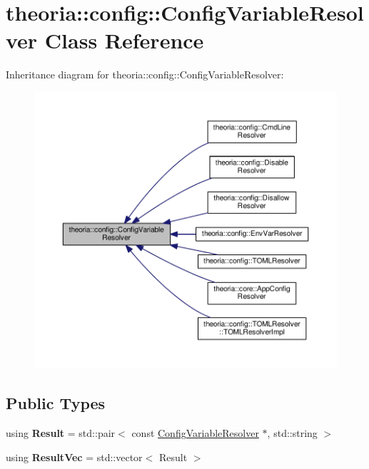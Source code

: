 \hypertarget{classtheoria_1_1config_1_1ConfigVariableResolver}{\section{theoria\+:\+:config\+:\+:Config\+Variable\+Resolver Class Reference}
\label{classtheoria_1_1config_1_1ConfigVariableResolver}
}


Inheritance diagram for theoria\+:\+:config\+:\+:Config\+Variable\+Resolver\+:
\nopagebreak
\begin{figure}[H]
\begin{center}
\leavevmode
\includegraphics[width=350pt]{classtheoria_1_1config_1_1ConfigVariableResolver__inherit__graph}
\end{center}
\end{figure}
\subsection*{Public Types}
\begin{DoxyCompactItemize}
\item 
\hypertarget{classtheoria_1_1config_1_1ConfigVariableResolver_af27a85262d802c9ad4ecb1179efaf447}{using {\bfseries Result} = std\+::pair$<$ const \hyperlink{classtheoria_1_1config_1_1ConfigVariableResolver}{Config\+Variable\+Resolver} $\ast$, std\+::string $>$}\label{classtheoria_1_1config_1_1ConfigVariableResolver_af27a85262d802c9ad4ecb1179efaf447}

\item 
\hypertarget{classtheoria_1_1config_1_1ConfigVariableResolver_a2d92a11d55181183ce4071566437f01b}{using {\bfseries Result\+Vec} = std\+::vector$<$ Result $>$}\label{classtheoria_1_1config_1_1ConfigVariableResolver_a2d92a11d55181183ce4071566437f01b}

\end{DoxyCompactItemize}
